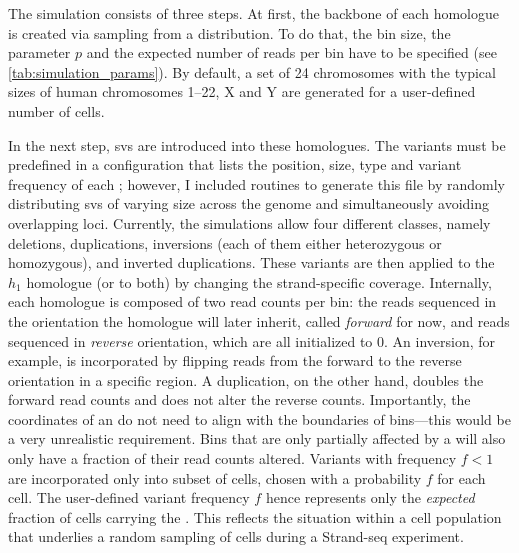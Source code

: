 The simulation consists of three steps. At first, the backbone of each homologue is
created via sampling from a \nb distribution. To do that, the bin size, the \nb
parameter $p$ and the expected number of reads per bin have to be specified
(see \cref{tab:simulation_params}). By default, a set of 24 chromosomes with the
typical sizes of human chromosomes 1--22, X and Y are generated for a user-defined number of cells.

In the next step, \acp{sv} are introduced into these homologues. The variants
must be predefined in a configuration that lists the position, size, \sv type
and variant frequency of each \sv; however, I included routines to generate this
file by randomly distributing \acp{sv} of varying size across the genome and
simultaneously avoiding overlapping loci. Currently, the simulations allow four
different \sv classes, namely deletions, duplications, inversions (each of them
either heterozygous or homozygous), and inverted duplications. These variants
are then applied to the $h_1$ homologue (or to both) by changing the
strand-specific coverage. Internally, each homologue is composed of two read
counts per bin: the reads sequenced in the orientation the
homologue will later inherit, called \emph{forward} for now, and reads sequenced
in \emph{reverse} orientation, which are all initialized to 0. An inversion,
for example, is incorporated by flipping reads from the forward to the reverse
orientation in a specific region. A duplication, on the other hand, doubles the
forward read counts and does not alter the reverse counts. Importantly, the
coordinates of an \sv do not need to align with the boundaries of bins---this
would be a very unrealistic requirement. Bins that are only partially affected
by a \sv will also only have a fraction of their read counts altered.
Variants with frequency $f<1$ are incorporated only into subset
of cells, chosen with a probability $f$ for each cell. The user-defined
variant frequency $f$ hence represents only the \emph{expected} fraction of cells
carrying the \sv. This reflects the situation within a cell population that
underlies a random sampling of cells during a Strand-seq experiment.

